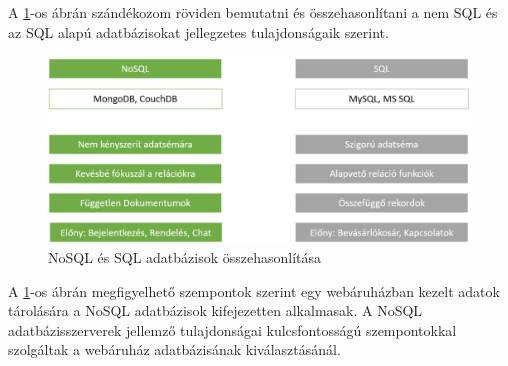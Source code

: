A \ref{fig.picture-6}-os ábrán szándékozom röviden bemutatni és összehasonlítani a nem SQL és az SQL alapú adatbázisokat jellegzetes tulajdonságaik szerint.

\begin{figure}[H]
	\centering
	\includegraphics[width=1.0\textwidth]{images/nosql_bemutatasa.png}
	\caption{NoSQL és SQL adatbázisok összehasonlítása}
	\label{fig.picture-6}
\end{figure}

A \ref{fig.picture-6}-os ábrán megfigyelhető szempontok szerint egy webáruházban kezelt adatok tárolására a NoSQL adatbázisok kifejezetten alkalmasak. A NoSQL adatbázisszerverek jellemző tulajdonságai kulcsfontosságú szempontokkal szolgáltak a webáruház adatbázisának kiválasztásánál.

